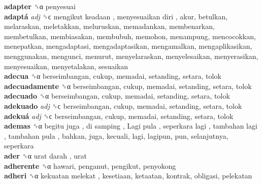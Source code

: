 \textbf{adapter} ␝α  penyesuai  \\
\textbf{adaptá} \emph{adj}  ␝ϲ   mengikut keadaan ,  menyesuaikan diri , akur, betulkan, melaraskan, meletakkan, meluruskan, memadankan, membenarkan, membetulkan, membiasakan, membubuh, memohon, menampung, mencocokkan, menepatkan, mengadaptasi, mengadaptasikan, mengamalkan, mengaplikasikan, menggunakan, mengunci, menurut, menyelaraskan, menyelesaikan, menyerasikan, menyesuaikan, menyetalakan, sesuaikan  \\
\textbf{adecua} ␝α  berseimbangan, cukup, memadai, setanding, setara, tolok  \\
\textbf{adecuadamente} ␝α  berseimbangan, cukup, memadai, setanding, setara, tolok  \\
\textbf{adecuado} ␝α  berseimbangan, cukup, memadai, setanding, setara, tolok  \\
\textbf{adekuado} \emph{adj}  ␝ϲ  berseimbangan, cukup, memadai, setanding, setara, tolok  \\
\textbf{adekuá} \emph{adj}  ␝ϲ  berseimbangan, cukup, memadai, setanding, setara, tolok  \\
\textbf{ademas} ␝α   begitu juga ,  di samping ,  Lagi pula ,  seperkara lagi ,  tambahan lagi ,  tambahan pula , bahkan, juga, kecuali, lagi, lagipun, pun, selanjutnya, seperkara  \\
\textbf{ader} ␝α   urat darah , urat  \\
\textbf{adherente} ␝α  hawari, penganut, pengikut, penyokong  \\
\textbf{adheri} ␝α   kekuatan melekat , kesetiaan, ketaatan, kontrak, obligasi, pelekatan  \\
